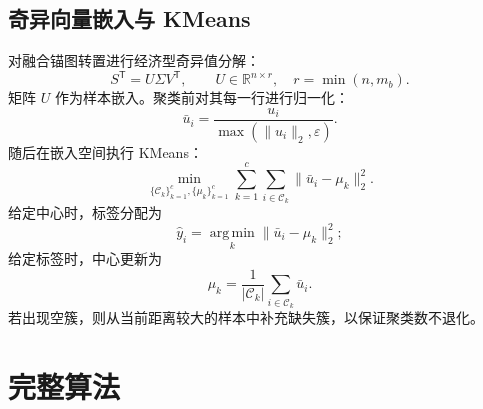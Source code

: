 \documentclass[UTF8,a4paper,12pt,fontset=none]{ctexart}
\newcommand{\R}{\mathbb{R}}
\newcommand{\argmin}{\operatorname*{arg\,min}}
\newcommand{\epsv}{\varepsilon}
\newcommand{\T}{\mathsf{T}}
\begin{document}
\subsection{奇异向量嵌入与 KMeans}

对融合锚图转置进行经济型奇异值分解：
\begin{equation}
S^\T=U\Sigma V^\T,
\qquad U\in\R^{n\times r},\quad r=\min(n,m_b).
\end{equation}
矩阵 \(U\) 作为样本嵌入。聚类前对其每一行进行归一化：
\begin{equation}
\bar u_i=
\frac{u_i}
{\max(\|u_i\|_2,\epsv)} .
\end{equation}
随后在嵌入空间执行 KMeans：
\begin{equation}
\min_{\{\mathcal C_k\}_{k=1}^{c},\{\mu_k\}_{k=1}^{c}}
\sum_{k=1}^{c}
\sum_{i\in\mathcal C_k}
\|\bar u_i-\mu_k\|_2^2 .
\end{equation}
给定中心时，标签分配为
\begin{equation}
\hat y_i=\argmin_{k}
\|\bar u_i-\mu_k\|_2^2 ;
\end{equation}
给定标签时，中心更新为
\begin{equation}
\mu_k=
\frac{1}{|\mathcal C_k|}
\sum_{i\in\mathcal C_k}\bar u_i .
\end{equation}
若出现空簇，则从当前距离较大的样本中补充缺失簇，以保证聚类数不退化。

\section{完整算法}
\end{document}
